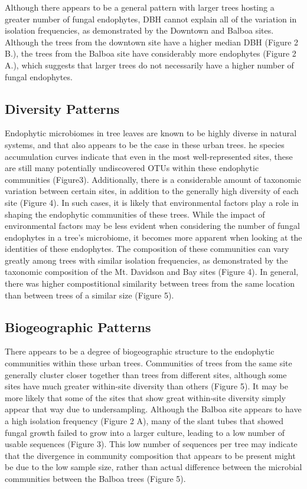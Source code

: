 \documentclass[fleqn,10pt,lineno]{wlpeerj} %
\begin{document}
Although there appears to be a general pattern with larger trees hosting
a greater number of fungal endophytes, DBH cannot explain all of the
variation in isolation frequencies, as demonstrated by the Downtown and
Balboa sites. Although the trees from the downtown site have a higher
median DBH (Figure 2 B.), the trees from the Balboa site have
considerably more endophytes (Figure 2 A.), which suggests that larger
trees do not necessarily have a higher number of fungal endophytes.

\hypertarget{diversity-patterns-1}{%
\subsection{Diversity Patterns}\label{diversity-patterns-1}}

Endophytic microbiomes in tree leaves are known to be highly diverse in
natural systems, and that also appears to be the case in these urban
trees. he species accumulation curves indicate that even in the most
well-represented sites, these are still many potentially undiscovered
OTUs within these endophytic communities (Figure3). Additionally, there
is a considerable amount of taxonomic variation between certain sites,
in addition to the generally high diversity of each site (Figure 4). In
such cases, it is likely that environmental factors play a role in
shaping the endophytic communities of these trees. While the impact of
environmental factors may be less evident when considering the number of
fungal endophytes in a tree's microbiome, it becomes more apparent when
looking at the identities of these endophytes. The composition of these
communities can vary greatly among trees with similar isolation
frequencies, as demonstrated by the taxonomic composition of the Mt.
Davidson and Bay sites (Figure 4). In general, there was higher
compostitional similarity between trees from the same location than
between trees of a similar size (Figure 5).

\hypertarget{biogeographic-patterns-1}{%
\subsection{Biogeographic Patterns}\label{biogeographic-patterns-1}}

There appears to be a degree of biogeographic structure to the
endophytic communities within these urban trees. Communities of trees
from the same site generally cluster closer together than trees from
different sites, although some sites have much greater within-site
diversity than others (Figure 5). It may be more likely that some of the
sites that show great within-site diversity simply appear that way due
to undersampling. Although the Balboa site appears to have a high
isolation frequency (Figure 2 A), many of the slant tubes that showed
fungal growth failed to grow into a larger culture, leading to a low
number of usable sequences (Figure 3). This low number of sequences per
tree may indicate that the divergence in community composition that
appears to be present might be due to the low sample size, rather than
actual difference between the microbial communities between the Balboa
trees (Figure 5).
\end{document}
